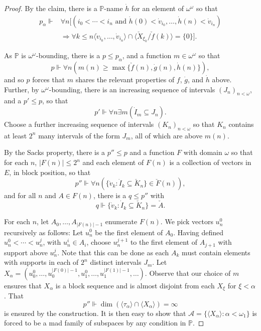 \documentclass[11pt]{amsart}
\newcommand{\forces}{\mathrel{\Vdash}}
\renewcommand{\P}{\mathbb{P}}
\newcommand{\LA}{\mathcal{A}}
\theoremstyle{definition}
\theoremstyle{remark}
\renewcommand{\P}{\mathbb{P}}
\renewcommand{\1}{\mathbf{1}}
\begin{document}
\begin{proof}
	By the claim, there is a $\P$-name $\dot{h}$ for an element of $\omega^\omega$ so that %
	\begin{align*}
		p_\alpha\forces &\forall n[(i_0<\cdots<i_n \text{ and } \dot{h}(0)<\dot{v}_{i_0},\ldots,\dot{h}(n)<\dot{v}_{i_n})\\
		&\Rightarrow \forall k\leq n\langle \dot{v}_{i_0},\ldots,\dot{v}_{i_n}\rangle\cap\langle \check{X}_{\xi_k}/\check{f}(k)\rangle=\{0\}].
	\end{align*}

	As $\P$ is $\omega^\omega$-bounding, there is a $p\leq p_\alpha$, and a function $m\in\omega^\omega$ so that
	\[
		p\forces\forall n(m(n)\geq\max\{\check{f}(n),\dot{g}(n),\dot{h}(n)\}),
	\]
	and so $p$ forces that $m$ shares the relevant properties of $f$, $\dot{g}$, and $\dot{h}$ above. Further, by $\omega^\omega$-bounding, there is an increasing sequence of intervals $(J_n)_{n<\omega}$, and a $p'\leq p$, so that
	\[
		p'\forces\forall n\exists m(\dot{I}_m\subseteq J_n).
	\]
	Choose a further increasing sequence of intervals $(K_n)_{n<\omega}$ so that $K_n$ contains at least $2^n$ many intervals of the form $J_m$, all of which are above $m(n)$.
	
	By the Sacks property, there is a $p''\leq p$ and a function $F$ with domain $\omega$ so that for each $n$, $|F(n)|\leq 2^n$ and each element of $F(n)$ is a collection of vectors in $E$, in block position, so that 
	\[
		p''\forces\forall n(\{\dot{v}_k:\dot{I}_k\subseteq \check{K}_n\}\in \check{F}(n)),
	\] 
	and for all $n$ and $A\in F(n)$, there is a $q\leq p''$ with
	\[
		q\forces\{\dot{v}_k:\dot{I}_k\subseteq \check{K}_n\}=\check{A}.
	\]
	
	For each $n$, let $A_0,\ldots, A_{|F(n)|-1}$ enumerate $F(n)$. We pick vectors $u^0_n$ recursively as follows: Let $u^0_n$ be the first element of $A_0$. Having defined $u^0_n<\cdots<u^j_n$, with $u^i_n\in A_i$, choose $u^{j+1}_n$ to the first element of $A_{j+1}$ with support above $u^j_n$. Note that this can be done as each $A_k$ must contain elements with supports in each of $2^n$ distinct intervals $J_m$. Let $X_\alpha=(u_0^0,\ldots,u^{|F(0)|-1}_0,u_1^0,\ldots,u_1^{|F(1)|-1},\ldots)$. Observe that our choice of $m$ ensures that $X_\alpha$ is a block sequence and is almost disjoint from each $X_\xi$ for $\xi<\alpha$. That
	\[
		p''\forces\dim(\langle \tau_\alpha\rangle\cap\langle X_\alpha\rangle)=\infty
	\]
	is ensured by the construction. It is then easy to show that $\LA=\{\langle X_\alpha\rangle:\alpha<\omega_1\}$ is forced to be a mad family of subspaces by any condition in $\P$.
\end{proof}
\end{document}
